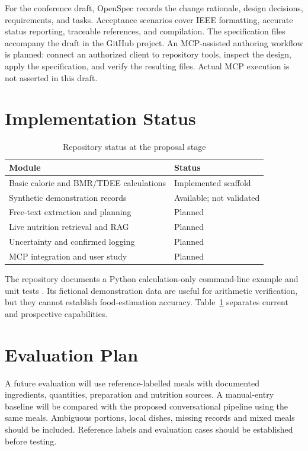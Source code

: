 \documentclass[conference]{IEEEtran}
\begin{document}
For the conference draft, OpenSpec records the change rationale, design decisions, requirements, and tasks. Acceptance scenarios cover IEEE formatting, accurate status reporting, traceable references, and compilation. The specification files accompany the draft in the GitHub project. An MCP-assisted authoring workflow is planned: connect an authorized client to repository tools, inspect the design, apply the specification, and verify the resulting files. Actual MCP execution is not asserted in this draft.
\section{Implementation Status}
\begin{table}[!t]\caption{Repository status at the proposal stage}\label{tab:status}\centering\footnotesize
\begin{tabular}{p{}p{}}\toprule Module & Status\\\midrule
Basic calorie and BMR/TDEE calculations & Implemented scaffold\\
Synthetic demonstration records & Available; not validated\\
Free-text extraction and planning & Planned\\
Live nutrition retrieval and RAG & Planned\\
Uncertainty and confirmed logging & Planned\\
MCP integration and user study & Planned\\\bottomrule\end{tabular}\end{table}
The repository documents a Python calculation-only command-line example and unit tests \cite{repo}. Its fictional demonstration data are useful for arithmetic verification, but they cannot establish food-estimation accuracy. Table~\ref{tab:status} separates current and prospective capabilities.
\section{Evaluation Plan}
A future evaluation will use reference-labelled meals with documented ingredients, quantities, preparation and nutrition sources. A manual-entry baseline will be compared with the proposed conversational pipeline using the same meals. Ambiguous portions, local dishes, missing records and mixed meals should be included. Reference labels and evaluation cases should be established before testing.
\end{document}
